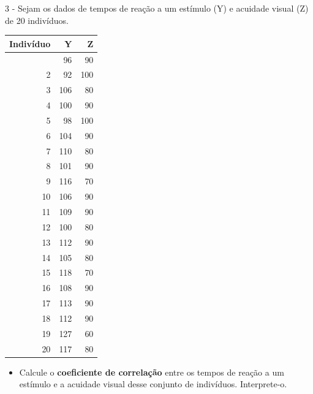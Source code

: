 \documentclass[11pt]{article}
\providecommand{\tightlist}{%
      \setlength{\itemsep}{0pt}\setlength{\parskip}{0pt}}
\begin{document}
    3 - Sejam os dados de tempos de reação a um estímulo (Y) e acuidade
visual (Z) de 20 indivíduos.

{\def\LTcaptype{none} %
\begin{longtable}[]{@{}rrr@{}}
\toprule\noalign{}
Indivíduo & Y & Z \\
\midrule\noalign{}
\endhead
\bottomrule\noalign{}
\endlastfoot
1 & 96 & 90 \\
2 & 92 & 100 \\
3 & 106 & 80 \\
4 & 100 & 90 \\
5 & 98 & 100 \\
6 & 104 & 90 \\
7 & 110 & 80 \\
8 & 101 & 90 \\
9 & 116 & 70 \\
10 & 106 & 90 \\
11 & 109 & 90 \\
12 & 100 & 80 \\
13 & 112 & 90 \\
14 & 105 & 80 \\
15 & 118 & 70 \\
16 & 108 & 90 \\
17 & 113 & 90 \\
18 & 112 & 90 \\
19 & 127 & 60 \\
20 & 117 & 80 \\
\end{longtable}
}

\begin{itemize}
\tightlist
\item
  Calcule o \textbf{coeficiente de correlação} entre os tempos de reação
  a um estímulo e a acuidade visual desse conjunto de indivíduos.
  Interprete-o.
\end{itemize}
\end{document}
